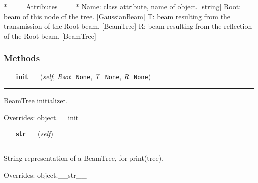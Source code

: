 *=== Attributes ===* Name: class attribute, name of object. [string] Root: 
beam of this node of the tree. [GaussianBeam] T: beam resulting from the 
transmission of the Root beam. [BeamTree] R: beam resulting from the 
reflection of the Root beam. [BeamTree]



  \subsubsection{Methods}

    \vspace{0.5ex}

\hspace{.8\funcindent}\begin{boxedminipage}{\funcwidth}

    \raggedright \textbf{\_\_init\_\_}(\textit{self}, \textit{Root}={\tt None}, \textit{T}={\tt None}, \textit{R}={\tt None})

    \vspace{-1.5ex}

    \rule{\textwidth}{0.5\fboxrule}
\setlength{\parskip}{2ex}
    BeamTree initializer.

\setlength{\parskip}{1ex}
      Overrides: object.\_\_init\_\_

    \end{boxedminipage}

    \vspace{0.5ex}

\hspace{.8\funcindent}\begin{boxedminipage}{\funcwidth}

    \raggedright \textbf{\_\_str\_\_}(\textit{self})

    \vspace{-1.5ex}

    \rule{\textwidth}{0.5\fboxrule}
\setlength{\parskip}{2ex}
    String representation of a BeamTree, for print(tree).

\setlength{\parskip}{1ex}
      Overrides: object.\_\_str\_\_

    \end{boxedminipage}

    \label{theia:tree:beamtree:BeamTree:lines}


